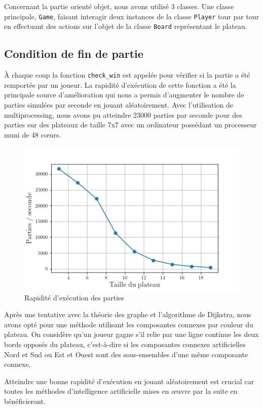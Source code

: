 \documentclass[a4paper]{article}
\theoremstyle{definition}
\begin{document}
Concernant la partie orienté objet, nous avons utilisé 3 classes. Une classe principale, \texttt{Game}, faisant interagir deux instances de la classe \texttt{Player} tour par tour en effectuant des actions sur l'objet de la classe \texttt{Board} représentant le plateau.

\subsection{Condition de fin de partie}

À chaque coup la fonction \texttt{check\_win} est appelée pour vérifier si la partie a été remportée par un joueur. La rapidité d'exécution de cette fonction a été la principale source d'amélioration qui nous a permis d'augmenter le nombre de parties simulées par seconde en jouant aléatoirement. Avec l'utilisation de multiprocessing, nous avons pu atteindre 23000 parties par seconde pour des parties sur des plateaux de taille 7x7 avec un ordinateur possédant un processeur muni de 48 cœurs.


\begin{figure}[h]
	\centering
	\includegraphics[scale=0.6]{pps.png}
	\caption{Rapidité d'exécution des parties}
	\label{fig:pps}
\end{figure}


Après une tentative avec la théorie des graphe et l'algorithme de Dijkstra, nous avons opté pour une méthode utilisant les composantes connexes par couleur du plateau. 
On considère qu'un joueur gagne s'il relie par une ligne continue les deux bords opposés du plateau, c'est-à-dire si les composantes connexes artificielles Nord et Sud ou Est et Ouest sont des sous-ensembles d'une même composante connexe.


Atteindre une bonne rapidité d'exécution en jouant aléatoirement est crucial car toutes les méthodes d'intelligence artificielle mises en œuvre par la suite en bénéficieront.
\end{document}
